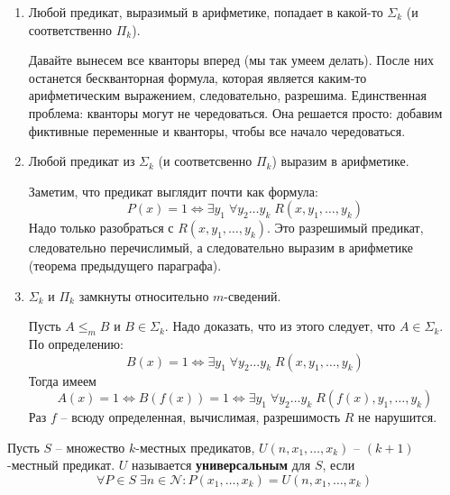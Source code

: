 \begin{enumerate}
    \item Любой предикат, выразимый в арифметике, попадает в какой-то $\Sigma_k$ (и соответственно $\Pi_k$).
    
    Давайте вынесем все кванторы вперед (мы так умеем делать). После них останется бескванторная формула, которая является каким-то арифметическим выражением, следовательно, разрешима. Единственная проблема: кванторы могут не чередоваться. Она решается просто: добавим фиктивные переменные и кванторы, чтобы все начало чередоваться.
    \item Любой предикат из $\Sigma_k$ (и соответсвенно $\Pi_k$) выразим в арифметике. 
    
    Заметим, что предикат выглядит почти как формула: \[ P(x) = 1 \Leftrightarrow \exists y_1 \; \forall y_2 \dots y_k \; R(x, y_1, \dots, y_k) \] Надо только разобраться с $R(x, y_1, \dots, y_k)$. Это разрешимый предикат, следовательно перечислимый, а следовательно выразим в арифметике (теорема предыдущего параграфа). 

    \item $\Sigma_k$ и $\Pi_k$ замкнуты относительно $m$-сведений.
    
    Пусть $A \leqslant_m B$ и $B \in \Sigma_k$. Надо доказать, что из этого следует, что $A \in \Sigma_k$. По определению: \[ B(x) = 1 \Leftrightarrow \exists y_1 \; \forall y_2 \dots y_k \; R(x, y_1, \dots, y_k) \]
    Тогда имеем \[ A(x) = 1 \Leftrightarrow B(f(x)) = 1 \Leftrightarrow \exists y_1 \; \forall y_2 \dots y_k \; R(f(x), y_1, \dots, y_k) \] Раз $f$ -- всюду определенная, вычислимая, разрешимость $R$ не нарушится. 
\end{enumerate}

\begin{conj}
    Пусть $S$ -- множество $k$-местных предикатов, $U(n, x_1, \dots, x_k)$ -- $(k+1)$-местный предикат. $U$ называется \textbf{универсальным} для $S$, если \[ \forall P \in S \; \exists n \in \mathcal{N} : P(x_1, \dots, x_k) = U(n, x_1, \dots, x_k) \]
\end{conj}

